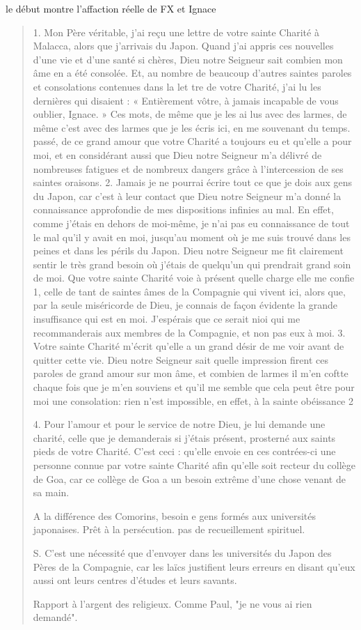 \begin{Synthesis}
le début montre l'affaction réelle de FX et Ignace
\end{Synthesis}
\begin{quote}
    1. Mon Père véritable, j'ai reçu une lettre de votre sainte Charité à Malacca, alors que j'arrivais du Japon. Quand j'ai appris
ces nouvelles d'une vie et d'une santé si chères, Dieu notre Seigneur
sait combien mon âme en a été consolée. Et, au nombre de beaucoup
d'autres saintes paroles et consolations contenues dans la let
tre de votre Charité, j'ai lu les dernières qui disaient : « Entièrement
vôtre, à jamais incapable de vous oublier, Ignace. » Ces
mots, de même que je les ai lus avec des larmes, de même c'est avec
des larmes que je les écris ici, en me souvenant du temps. passé,
de ce grand amour que votre Charité a toujours eu et qu'elle a pour
moi, et en considérant aussi que Dieu notre Seigneur m'a délivré
de nombreuses fatigues et de nombreux dangers grâce à l'intercession
de ses saintes oraisons.
2. Jamais je ne pourrai écrire tout ce que je dois aux gens du
Japon, car c'est à leur contact que Dieu notre Seigneur m'a donné
la connaissance approfondie de mes dispositions infinies au mal.
En effet, comme j'étais en dehors de moi-même, je n'ai pas eu
connaissance de tout le mal qu'il y avait en moi, jusqu'au moment
où je me suis trouvé dans les peines et dans les périls du Japon.
Dieu notre Seigneur me fit clairement sentir le très grand besoin
où j'étais de quelqu'un qui prendrait grand soin de moi. Que votre
sainte Charité voie à présent quelle charge elle me confie 1, celle
de tant de saintes âmes de la Compagnie qui vivent ici, alors que,
par la seule miséricorde de Dieu, je connais de façon évidente la
grande insuffisance qui est en moi. J'espérais que ce serait nioi qui
me recommanderais aux membres de la Compagnie, et non pas eux
à moi.
3. Votre sainte Charité m'écrit qu'elle a un grand désir de me
voir avant de quitter cette vie. Dieu notre Seigneur sait quelle
impression firent ces paroles de grand amour sur mon âme, et
combien de larmes il m'en coftte chaque fois que je m'en souviens
et qu'il me semble que cela peut être pour moi une consolation:
rien n'est impossible, en effet, à la sainte obéissance 2

4. Pour l'amour et pour le service de notre Dieu, je lui demande
une charité, celle que je demanderais si j'étais présent, prosterné
aux saints pieds de votre Charité. C'est ceci : qu'elle envoie en ces
contrées-ci une personne connue par votre sainte Charité afin
qu'elle soit recteur du collège de Goa, car ce collège de Goa a un
besoin extrême d'une chose venant de sa main.
\begin{Synthesis}
A la différence des Comorins, besoin e gens formés aux universités japonaises. Prêt à la persécution. pas de recueillement spirituel. 
\end{Synthesis}
S. C'est une nécessité que d'envoyer dans les universités du
    Japon des Pères de la Compagnie, car les laïcs justifient leurs
erreurs en disant qu'eux aussi ont leurs centres d'études et leurs
savants.
\begin{Synthesis}
Rapport à l'argent des religieux. Comme Paul, "je ne vous ai rien demandé".


\end{Synthesis}
\end{quote}

